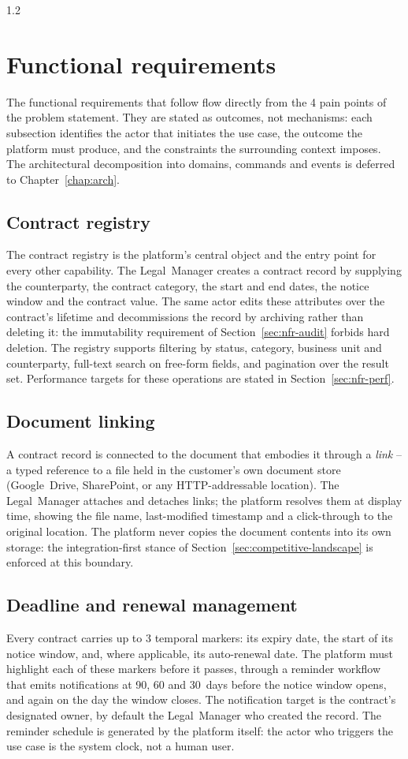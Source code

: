 \begin{spacing}{1.2}
\section{Functional requirements}
\label{sec:functional-requirements}

The functional requirements that follow flow directly from the 4 pain
points of the problem statement. They are stated as outcomes, not mechanisms:
each subsection identifies the actor that initiates
the use case, the outcome the platform must produce, and the constraints
the surrounding context imposes. The architectural decomposition into
domains, commands and events is deferred to Chapter~\ref{chap:arch}.

\subsection{Contract registry}
The contract registry is the platform's central object and the entry
point for every other capability. The Legal~Manager creates a contract
record by supplying the counterparty, the contract category, the start
and end dates, the notice window and the contract value. The same actor
edits these attributes over the contract's lifetime and decommissions
the record by archiving rather than deleting it: the immutability
requirement of Section~\ref{sec:nfr-audit} forbids hard deletion. The
registry supports filtering by status, category, business unit and
counterparty, full-text search on free-form fields, and pagination over
the result set. Performance targets for these operations are stated in
Section~\ref{sec:nfr-perf}.

\subsection{Document linking}
A contract record is connected to the document that embodies it
through a \textit{link} -- a typed reference to a file held in the
customer's own document store (Google~Drive, SharePoint, or any
HTTP-addressable location). The Legal~Manager attaches and detaches
links; the platform resolves them at display time, showing the file
name, last-modified timestamp and a click-through to the original
location. The platform never copies the document contents into its own
storage: the integration-first stance of
Section~\ref{sec:competitive-landscape} is enforced at this boundary.

\subsection{Deadline and renewal management}
Every contract carries up to 3 temporal markers: its expiry date,
the start of its notice window, and, where applicable, its
auto-renewal date. The platform must highlight each of these markers
before it passes, through a reminder workflow that emits notifications
at 90, 60 and 30~days before the notice window opens, and again on the
day the window closes. The notification target is the contract's
designated owner, by default the Legal~Manager who created the record.
The reminder schedule is generated by the platform itself: the actor
who triggers the use case is the system clock, not a human user.


\end{spacing}
